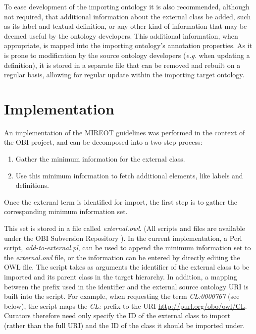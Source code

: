 \documentclass{ao2e}%
\begin{document}
To ease development of the importing ontology it is also recommended, although not required, that additional information about the external class be added, such as its label and textual definition, or any other kind of information that may be deemed useful by the ontology developers.
This additional information, when appropriate, is mapped into the importing ontology's annotation properties. As it is prone to modification by the source ontology developers (\textit{e.g.} when updating a definition), it is stored in a separate file that can be removed and rebuilt on a regular basis, allowing for regular update within the importing target ontology. %


\section{Implementation}

An implementation of the \ac{MIREOT} guidelines was performed in the context of the \ac{OBI} project, and can be decomposed into a two-step process:

\begin{enumerate}
\item Gather the minimum information for the external class.
\item Use this minimum information to fetch additional elements, like labels and definitions.
\end{enumerate}

Once the external term is identified for import, the first step is to gather the corresponding minimum information set.

This set is stored in a file called \emph{external.owl}. (All scripts and files are available under the \ac{OBI} Subversion Repository \cite{OBIScripts}).
In the current implementation, a Perl script, \emph{add-to-external.pl}, can be used to append the minimum information set to the \emph{external.owl} file, or the information can be entered by directly editing the OWL file. %
The script takes as arguments the identifier of the external class to be imported and its parent class in the target hierarchy.
In addition, a mapping between the prefix used in the identifier and the external source ontology URI is built into the script. For example, when requesting the term \textit{CL:0000767} (see below), the script maps the \textit{CL:} prefix to the URI \url{http://purl.org/obo/owl/CL}.
Curators therefore need only specify the ID of the external class to import (rather than the full URI) and the ID of the class it should be imported under.
\end{document}
